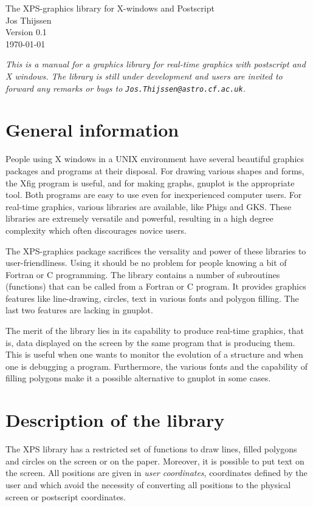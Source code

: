 \Large
\bc
The XPS-graphics library for X-windows and Postscript \vs{1em} \\
\large
Jos Thijssen \\
Version 0.1 \\
\today
\ec
\ns

\it
This is a manual for a graphics library for real-time graphics 
with postscript and X windows. The library is still under development and
users are invited to forward any remarks or bugs to {\tt Jos.Thijssen@astro.cf.ac.uk}.
\rm


\section{General information}

People using X windows in a UNIX environment have several beautiful 
graphics packages and programs at their disposal. For drawing various 
shapes and forms, the Xfig program is useful, and for making graphs, gnuplot
is the appropriate tool. Both programs are easy to use even for inexperienced
computer users. For real-time graphics, various libraries are available, like
Phigs and GKS. These libraries are extremely versatile and powerful, resulting
in a high degree complexity which often discourages 
novice users. 

The XPS-graphics package sacrifices the versality and power of these libraries 
to user-friendliness. Using it should be no problem for people knowing
a bit of Fortran or C programming. The library contains a number of 
subroutines (functions) that can be called from a Fortran or C program.
It provides graphics features like line-drawing, circles, text in various
fonts and polygon filling. The last two features are lacking in gnuplot.

The merit of the library lies in its capability to produce real-time graphics,
that is, data displayed on the screen by the same program that is producing 
them. This is useful when 
one wants to monitor the evolution of a structure and when one 
is debugging a program. Furthermore, the various fonts and the capability of
filling polygons make it a possible alternative to gnuplot in some cases. 

\section{Description of the library}

The XPS library has a restricted set of functions to draw lines, filled polygons
and circles on the screen or on the paper. Moreover, it is possible to put 
text on the screen. All positions are given in {\it user coordinates}, 
coordinates defined by the user and which avoid the necessity of converting 
all positions to the physical screen or postscript coordinates. 

